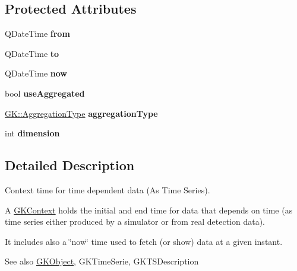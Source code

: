 \subsection*{Protected Attributes}
\begin{DoxyCompactItemize}
\item 
Q\+Date\+Time {\bfseries from}\hypertarget{classGKContext_a4ca3da6973783aac9a14aeaa3e03d89e}{}\label{classGKContext_a4ca3da6973783aac9a14aeaa3e03d89e}

\item 
Q\+Date\+Time {\bfseries to}\hypertarget{classGKContext_aad9c04c98aa6b5feb2726924d59e41a4}{}\label{classGKContext_aad9c04c98aa6b5feb2726924d59e41a4}

\item 
Q\+Date\+Time {\bfseries now}\hypertarget{classGKContext_af6111c6215d4e8ea310190079023231d}{}\label{classGKContext_af6111c6215d4e8ea310190079023231d}

\item 
bool {\bfseries use\+Aggregated}\hypertarget{classGKContext_a63b53add5db1ce35c77589f33de975f7}{}\label{classGKContext_a63b53add5db1ce35c77589f33de975f7}

\item 
\hyperlink{namespaceGK_ae682f9fb77047e45fa91c27e569b8fee}{G\+K\+::\+Aggregation\+Type} {\bfseries aggregation\+Type}\hypertarget{classGKContext_a851d59b4d7f6d7b1944d12e9836af1fb}{}\label{classGKContext_a851d59b4d7f6d7b1944d12e9836af1fb}

\item 
int {\bfseries dimension}\hypertarget{classGKContext_a3878036cac962e371cfdbfb86b615a37}{}\label{classGKContext_a3878036cac962e371cfdbfb86b615a37}

\end{DoxyCompactItemize}


\subsection{Detailed Description}
Context time for time dependent data (As Time Series). 

A \hyperlink{classGKContext}{G\+K\+Context} holds the initial and end time for data that depends on time (as time series either produced by a simulator or from real detection data).

It includes also a \char`\"{}now\char`\"{} time used to fetch (or show) data at a given instant.

\begin{DoxySeeAlso}{See also}
\hyperlink{classGKObject}{G\+K\+Object}, G\+K\+Time\+Serie, G\+K\+T\+S\+Description 
\end{DoxySeeAlso}


